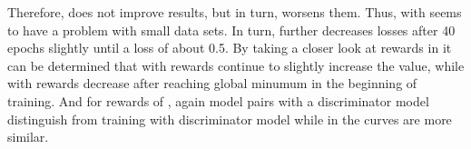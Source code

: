 Therefore, \origsampling does not improve results, but in turn, worsens them.
Thus, \kbgan with \origsampling seems to have a problem with small data sets.
In turn, \ussoftmax further decreases losses after 40 epochs slightly until a loss of about 0.5.
By taking a closer look at rewards in  it can be determined that with \origsampling rewards continue to slightly increase the value, while with \ussoftmax rewards decrease after reaching global minumum in the beginning of training. 
And for rewards of \ussoftmax, again model pairs with a \transd discriminator model distinguish from training with \transe discriminator model while in \origsampling the curves are more similar.